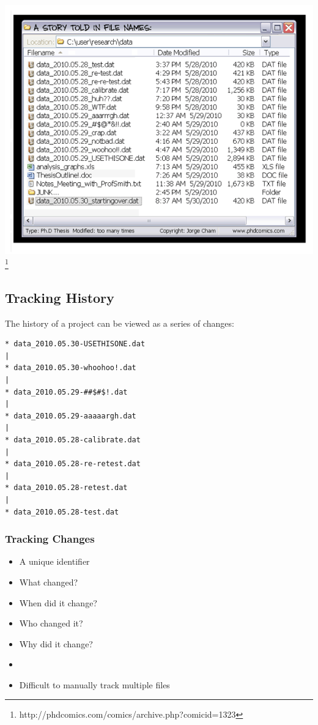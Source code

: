 \begin{frame}
  \centering
  \includegraphics[height=0.95\textheight]{phd1323}
  \footnote{http://phdcomics.com/comics/archive.php?comicid=1323}
\end{frame}

\subsection{Tracking History}

\begin{frame}[fragile]
The history of a project can be viewed as a series of changes:
\small
\begin{verbatim}
* data_2010.05.30-USETHISONE.dat
|
* data_2010.05.30-whoohoo!.dat
|
* data_2010.05.29-##$#$!.dat
|
* data_2010.05.29-aaaaargh.dat
|
* data_2010.05.28-calibrate.dat
|
* data_2010.05.28-re-retest.dat
|
* data_2010.05.28-retest.dat
|
* data_2010.05.28-test.dat
\end{verbatim}
\end{frame}

\begin{frame}
  \frametitle{Tracking Changes}
  \begin{itemize}
    \item A unique identifier
    \item What changed?
    \item When did it change?
    \item Who changed it?
    \item Why did it change?
    \item[]
    \item Difficult to manually track multiple files
  \end{itemize}
\end{frame}

